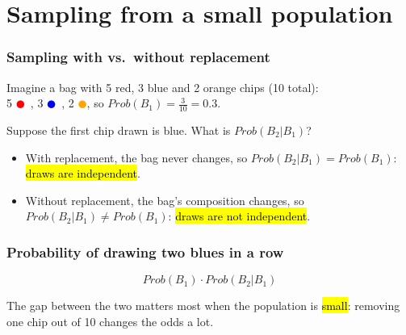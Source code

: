 \documentclass[slidestop,compress,mathserif]{beamer}
\begin{document}
\section{Sampling from a small population}


\begin{frame}
\frametitle{Sampling with vs.\ without replacement}

Imagine a bag with 5 red, 3 blue and 2 orange chips (10 total):\\
5 \textcolor{red}{$\CIRCLE$}~, 3 \textcolor{blue}{$\CIRCLE$}~, 2 \textcolor{orange}{$\CIRCLE$},
so $Prob(B_1) = \frac{3}{10} = 0.3$.

\pause

Suppose the first chip drawn is blue. What is $Prob(B_2 | B_1)$?

\pause
\vspace{1mm}


\pause

{\footnotesize
\begin{itemize}
\item With replacement, the bag never changes, so $Prob(B_2|B_1) = Prob(B_1)$: \hl{draws are independent}.
\item Without replacement, the bag's composition changes, so $Prob(B_2|B_1) \ne Prob(B_1)$: \hl{draws are not independent}.
\end{itemize}
}

\end{frame}


\begin{frame}
\frametitle{Probability of drawing two blues in a row}

\[ Prob(B_1) \cdot Prob(B_2 | B_1) \]

\pause
\vspace{3mm}


\pause
\vspace{2mm}

The gap between the two matters most when the population is \hl{small}: removing one chip out of 10 changes the odds a lot.

\end{frame}
\end{document}

